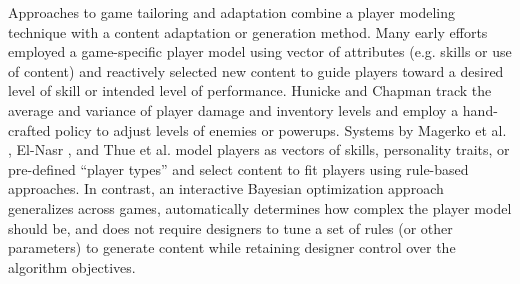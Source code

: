 \documentclass{sig-alternate}
\begin{document}
Approaches to game tailoring and adaptation combine a player modeling technique with a content adaptation or generation method. Many early efforts employed a game-specific player model using vector of attributes (e.g. skills or use of content) and reactively selected new content to guide players toward a desired level of skill or intended level of performance. Hunicke and Chapman \cite{hunicke2004:dda} track the average and variance of player damage and inventory levels and employ a hand-crafted policy to adjust levels of enemies or powerups. 
Systems by Magerko et al. \cite{magerko2006:isat}, El-Nasr \cite{seifel-nasr2007:mirage}, and Thue et al. \cite{thue2007:storytell-pm} model players as vectors of skills, personality traits, or pre-defined ``player types'' and select content to fit players using rule-based approaches. In contrast, an interactive Bayesian optimization approach generalizes across games, automatically determines how complex the player model should be, and does not require designers to tune a set of rules (or other parameters) to generate content while retaining designer control over the algorithm objectives. 


\end{document}
